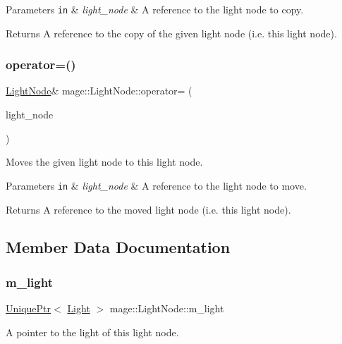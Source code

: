 \begin{DoxyParams}[1]{Parameters}
\mbox{\tt in}  & {\em light\+\_\+node} & A reference to the light node to copy. \\
\hline
\end{DoxyParams}
\begin{DoxyReturn}{Returns}
A reference to the copy of the given light node (i.\+e. this light node). 
\end{DoxyReturn}
\hypertarget{classmage_1_1_light_node_abda92f7cf2ce3aed3af94d2278e2bfa1}{}\label{classmage_1_1_light_node_abda92f7cf2ce3aed3af94d2278e2bfa1} 
\subsubsection{\texorpdfstring{operator=()}{operator=()}\hspace{0.1cm}{\footnotesize\ttfamily [2/2]}}
{\footnotesize\ttfamily \hyperlink{classmage_1_1_light_node}{Light\+Node}\& mage\+::\+Light\+Node\+::operator= (\begin{DoxyParamCaption}\item[{\hyperlink{classmage_1_1_light_node}{Light\+Node} \&\&}]{light\+\_\+node }\end{DoxyParamCaption})\hspace{0.3cm}{\ttfamily [delete]}}

Moves the given light node to this light node.


\begin{DoxyParams}[1]{Parameters}
\mbox{\tt in}  & {\em light\+\_\+node} & A reference to the light node to move. \\
\hline
\end{DoxyParams}
\begin{DoxyReturn}{Returns}
A reference to the moved light node (i.\+e. this light node). 
\end{DoxyReturn}


\subsection{Member Data Documentation}
\hypertarget{classmage_1_1_light_node_aad97d01d2adb66eac0e93bdcdb919a05}{}\label{classmage_1_1_light_node_aad97d01d2adb66eac0e93bdcdb919a05} 
\subsubsection{\texorpdfstring{m\+\_\+light}{m\_light}}
{\footnotesize\ttfamily \hyperlink{namespacemage_a3316d7143a973e37adf1110f2e80ca31}{Unique\+Ptr}$<$ \hyperlink{classmage_1_1_light}{Light} $>$ mage\+::\+Light\+Node\+::m\+\_\+light\hspace{0.3cm}{\ttfamily [private]}}

A pointer to the light of this light node. 